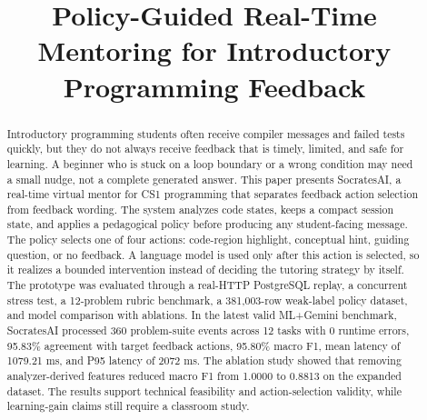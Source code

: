 \documentclass[conference]{IEEEtran}
\begin{document}
\title{Policy-Guided Real-Time Mentoring for Introductory Programming Feedback}

\author{
    \and
}

\maketitle

\begin{abstract}
Introductory programming students often receive compiler messages and failed tests quickly, but they do not always receive feedback that is timely, limited, and safe for learning. A beginner who is stuck on a loop boundary or a wrong condition may need a small nudge, not a complete generated answer. This paper presents SocratesAI, a real-time virtual mentor for CS1 programming that separates feedback action selection from feedback wording. The system analyzes code states, keeps a compact session state, and applies a pedagogical policy before producing any student-facing message. The policy selects one of four actions: code-region highlight, conceptual hint, guiding question, or no feedback. A language model is used only after this action is selected, so it realizes a bounded intervention instead of deciding the tutoring strategy by itself. The prototype was evaluated through a real-HTTP PostgreSQL replay, a concurrent stress test, a 12-problem rubric benchmark, a 381,003-row weak-label policy dataset, and model comparison with ablations. In the latest valid ML+Gemini benchmark, SocratesAI processed 360 problem-suite events across 12 tasks with 0 runtime errors, 95.83\% agreement with target feedback actions, 95.80\% macro F1, mean latency of 1079.21 ms, and P95 latency of 2072 ms. The ablation study showed that removing analyzer-derived features reduced macro F1 from 1.0000 to 0.8813 on the expanded dataset. The results support technical feasibility and action-selection validity, while learning-gain claims still require a classroom study.
\end{abstract}
\end{document}
